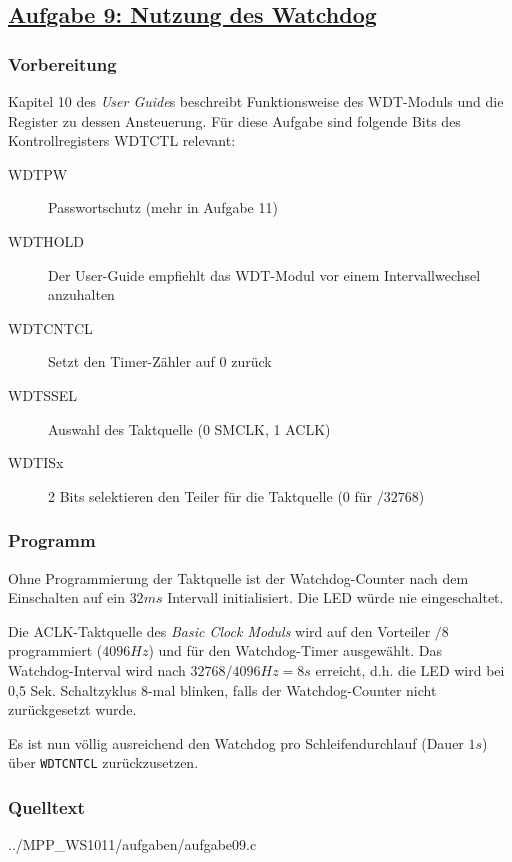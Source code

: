 \subsection
{\href{http://cst.mi.fu-berlin.de/intern/19606-P-MPP/Aufgaben/040301.html}
{Aufgabe 9: Nutzung des Watchdog}}

\subsubsection*{Vorbereitung}

Kapitel 10 des \emph{User Guide}s beschreibt Funktionsweise des
WDT-Moduls und die Register zu dessen Ansteuerung. Für diese Aufgabe
sind folgende Bits des Kontrollregisters WDTCTL relevant:

\begin{description}
    \item [WDTPW]    Passwortschutz (mehr in Aufgabe 11)
    \item [WDTHOLD]  Der User-Guide empfiehlt das WDT-Modul vor einem
Intervallwechsel anzuhalten
    \item [WDTCNTCL] Setzt den Timer-Zähler auf
0 zurück \item [WDTSSEL]  Auswahl des Taktquelle (0 SMCLK, 1 ACLK)
    \item [WDTISx]   2 Bits selektieren den Teiler für die Taktquelle (0 für
$/32768$) \end{description}

\subsubsection*{Programm}

Ohne Programmierung der Taktquelle ist der Watchdog-Counter nach dem
Einschalten auf ein $32 ms$ Intervall initialisiert. Die LED würde nie
eingeschaltet.

Die ACLK-Taktquelle des \emph{Basic Clock Moduls} wird auf den Vorteiler
$/8$ programmiert ($4096 Hz$) und für den Watchdog-Timer ausgewählt. Das
Watchdog-Interval wird nach $32768 / 4096 Hz = 8 s$ erreicht, d.h. die
LED wird bei 0,5 Sek. Schaltzyklus 8-mal blinken, falls der
Watchdog-Counter nicht zurückgesetzt wurde.

Es ist nun völlig ausreichend den Watchdog pro Schleifendurchlauf (Dauer
$1 s$) über \texttt{WDTCNTCL} zurückzusetzen.

\subsubsection*{Quelltext}


{../MPP_WS1011/aufgaben/aufgabe09.c}
